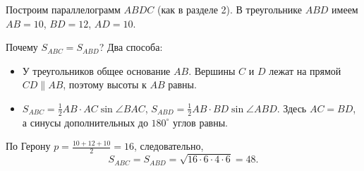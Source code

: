 \documentclass[a4paper,12pt]{article}
\begin{document}
Построим параллелограмм $ABDC$ (как в разделе 2). В треугольнике $ABD$ имеем $AB=10$, $BD=12$, $AD=10$.
\begin{center}
\end{center}
Почему $S_{ABC}=S_{ABD}$? Два способа:
\begin{itemize}
\item У треугольников общее основание $AB$. Вершины $C$ и $D$ лежат на прямой $CD\parallel AB$, поэтому высоты к $AB$ равны.
\item $S_{ABC}=\frac12 AB\cdot AC\sin\angle BAC$, $S_{ABD}=\frac12 AB\cdot BD\sin\angle ABD$. Здесь $AC=BD$, а синусы дополнительных до $180^\circ$ углов равны.
\end{itemize}
По Герону $p=\frac{10+12+10}{2}=16$, следовательно,
\[
 S_{ABC}=S_{ABD}=\sqrt{16\cdot6\cdot4\cdot6}=\boxed{48}.
\]
\clearpage
\end{document}
